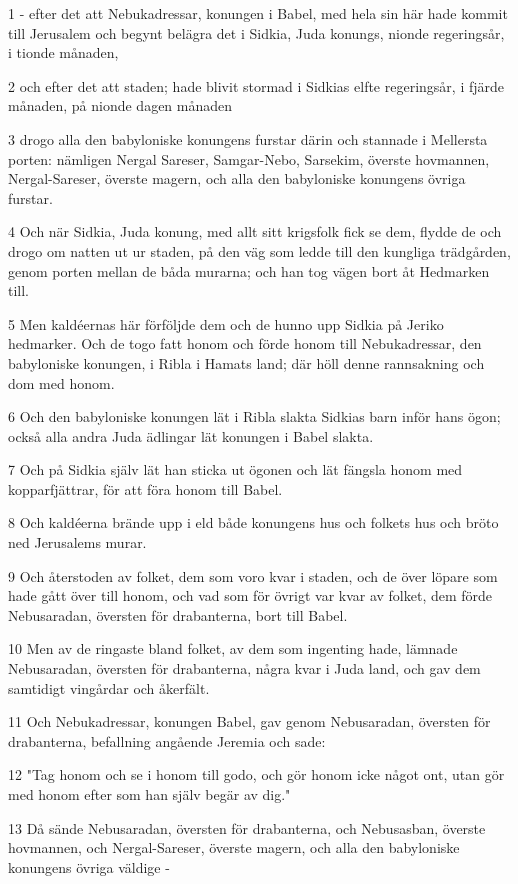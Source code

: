 \par 1 - efter det att Nebukadressar, konungen i Babel, med hela sin här hade kommit till Jerusalem och begynt belägra det i Sidkia, Juda konungs, nionde regeringsår, i tionde månaden,
\par 2 och efter det att staden; hade blivit stormad i Sidkias elfte regeringsår, i fjärde månaden, på nionde dagen månaden
\par 3 drogo alla den babyloniske konungens furstar därin och stannade i Mellersta porten: nämligen Nergal Sareser, Samgar-Nebo, Sarsekim, överste hovmannen, Nergal-Sareser, överste magern, och alla den babyloniske konungens övriga furstar.
\par 4 Och när Sidkia, Juda konung, med allt sitt krigsfolk fick se dem, flydde de och drogo om natten ut ur staden, på den väg som ledde till den kungliga trädgården, genom porten mellan de båda murarna; och han tog vägen bort åt Hedmarken till.
\par 5 Men kaldéernas här förföljde dem och de hunno upp Sidkia på Jeriko hedmarker. Och de togo fatt honom och förde honom till Nebukadressar, den babyloniske konungen, i Ribla i Hamats land; där höll denne rannsakning och dom med honom.
\par 6 Och den babyloniske konungen lät i Ribla slakta Sidkias barn inför hans ögon; också alla andra Juda ädlingar lät konungen i Babel slakta.
\par 7 Och på Sidkia själv lät han sticka ut ögonen och lät fängsla honom med kopparfjättrar, för att föra honom till Babel.
\par 8 Och kaldéerna brände upp i eld både konungens hus och folkets hus och bröto ned Jerusalems murar.
\par 9 Och återstoden av folket, dem som voro kvar i staden, och de över löpare som hade gått över till honom, och vad som för övrigt var kvar av folket, dem förde Nebusaradan, översten för drabanterna, bort till Babel.
\par 10 Men av de ringaste bland folket, av dem som ingenting hade, lämnade Nebusaradan, översten för drabanterna, några kvar i Juda land, och gav dem samtidigt vingårdar och åkerfält.
\par 11 Och Nebukadressar, konungen Babel, gav genom Nebusaradan, översten för drabanterna, befallning angående Jeremia och sade:
\par 12 "Tag honom och se i honom till godo, och gör honom icke något ont, utan gör med honom efter som han själv begär av dig."
\par 13 Då sände Nebusaradan, översten för drabanterna, och Nebusasban, överste hovmannen, och Nergal-Sareser, överste magern, och alla den babyloniske konungens övriga väldige -
